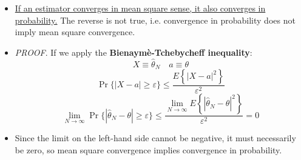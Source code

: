 \begin{itemize}
\(\longrightarrow\) \textbf{convergence in mean square sense} is guaranteed when the estimator is asymptotically unbiased and the estimation variance goes to zero when the data size \(N\) grows to infinity, as previously stated.
\item \underline{If an estimator converges in mean square sense, it also converges in probability.} The reverse is not true, i.e. convergence in probability does not imply mean square convergence.
\item \textit{PROOF}. If we apply the \textbf{Bienaymè-Tchebycheff inequality}: 
\[
X \equiv \hat{\theta}_N
\quad
a \equiv \theta
\]
\[
\Pr \{ | X - a | \geq \varepsilon \} \leq \frac{ E \left\{ | X - a |^2 \right\} }{ \varepsilon^2 }
\]
\[
\lim_{N \to \infty} \Pr \{ | \hat{\theta}_N - \theta | \geq \varepsilon \} \leq \frac{ \lim_{N \to \infty} E \left\{ | \hat{\theta}_N - \theta |^2 \right\} }{ \varepsilon^2 } = 0
\]
\item Since the limit on the left-hand side cannot be negative, it must necessarily be zero, so mean square convergence implies convergence in probability.
\end{itemize}
